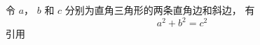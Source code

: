 
令 $a$， $b$ 和 $c$ 分别为直角三角形的两条直角边和斜边， 有
\begin{equation}\label{test_eq1}
a^2 + b^2 = c^2
\end{equation}
引用
